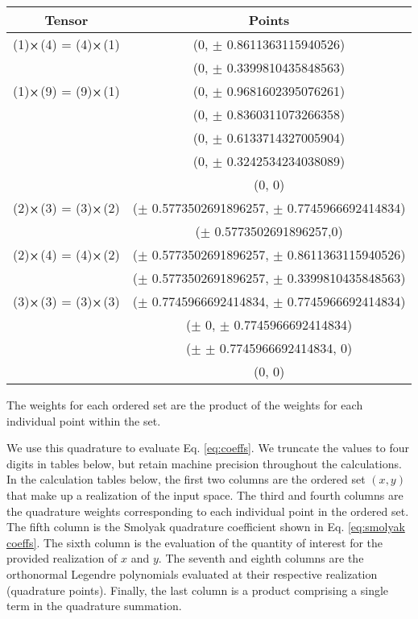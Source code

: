 \documentclass[11pt]{article}
\begin{document}
\begin{table}[H]
  \centering
  \begin{tabular}{c c}
    Tensor & Points \\ \hline
    (1)$\cross$(4) = (4)$\cross$(1)  & (0, $\pm$ 0.8611363115940526)   \\
                                     & (0, $\pm$ 0.3399810435848563)  \\ \hline
    (1)$\cross$(9) = (9)$\cross$(1)  & (0, $\pm$  0.9681602395076261)  \\
                                     & (0, $\pm$ 0.8360311073266358)  \\
                                     & (0, $\pm$ 0.6133714327005904)  \\
                                     & (0, $\pm$ 0.3242534234038089)  \\
                                     & (0, 0)  \\ \hline
    (2)$\cross$(3) = (3)$\cross$(2)  & ($\pm$ 0.5773502691896257, $\pm$ 0.7745966692414834)  \\
                                     & ($\pm$ 0.5773502691896257,0)  \\
    (2)$\cross$(4) = (4)$\cross$(2)  & ($\pm$ 0.5773502691896257, $\pm$ 0.8611363115940526)  \\
                                     & ($\pm$ 0.5773502691896257, $\pm$ 0.3399810435848563)  \\
    (3)$\cross$(3) = (3)$\cross$(3)  & ($\pm$ 0.7745966692414834, $\pm$ 0.7745966692414834)  \\
                                     & ($\pm$ 0, $\pm$ 0.7745966692414834)  \\
                                     & ($\pm$ $\pm$ 0.7745966692414834, 0)  \\
                                     & (0, 0)  \\
  \end{tabular}
\end{table}
The weights for each ordered set are the product of the weights for each individual point within the set.

We use this quadrature to evaluate Eq. \ref{eq:coeffs}.
We truncate the values to four digits in tables below, but retain machine precision throughout the calculations.  
In the calculation tables below, the first two columns are the
ordered set $(x,y)$ that make up a realization of the input space.  The third and fourth columns are the quadrature
weights corresponding to each individual point in the ordered set.  The fifth column is the Smolyak quadrature
coefficient shown in Eq. \ref{eq:smolyak coeffs}.  The sixth column is the evaluation of the quantity of
interest for the provided realization of $x$ and $y$.  The seventh and eighth columns are the orthonormal Legendre
polynomials evaluated at their respective realization (quadrature points).  Finally, the last column is a product comprising
a single term in the quadrature summation.
\newpage
\end{document}
